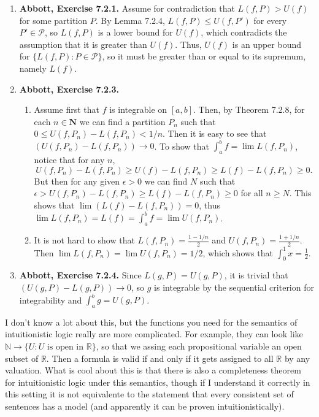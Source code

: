 \documentclass{article}
\newcommand{\N}{\mathbf{N}}
\newcommand{\paren}[1]{\left( #1 \right)}
\newcommand{\set}[1]{\{#1\}}
\newcommand{\exc}[2][Abbott]{\item \textbf{#1, Exercise #2.}}
\begin{document}
\begin{enumerate}
    \exc{7.2.1}
    Assume for contradiction that $L(f, P) > U(f)$ for some partition $P$. By Lemma 7.2.4, $L(f, P) \leq U(f, P')$ for every $P' \in \mathcal{P}$, so $L(f, P)$ is a lower bound for $U(f)$, which contradicts the assumption that it is greater than $U(f)$. Thus, $U(f)$ is an upper bound for $\set{L(f, P): P \in \mathcal{P}}$, so it must be greater than or equal to its supremum, namely $L(f)$.
    
    \exc{7.2.3}
    \begin{enumerate}
        \item Assume first that $f$ is integrable on $[a, b]$. Then, by Theorem 7.2.8, for each $n \in \N$ we can find a partition $P_n$ such that $0 \leq U(f, P_n) - L(f, P_n) < 1/n$. Then it is easy to see that $(U(f, P_n) - L(f, P_n)) \to 0$. To show that $\int_a^b f = \lim L(f, P_n)$, notice that for any $n$,
        \begin{equation*}
            U(f, P_n) - L(f, P_n) \geq U(f) - L(f, P_n) \geq L(f) - L(f, P_n) \geq 0.
        \end{equation*} But then for any given $\epsilon > 0$ we can find $N$ such that $\epsilon > U(f, P_n) - L(f, P_n) \geq L(f) - L(f, P_n) \geq 0$ for all $n \geq N$. This shows that $\lim \paren{L(f) - L(f, P_n)} = 0$, thus $\lim L(f, P_n) = L(f) = \int_a^b f = \lim U(f, P_n)$.
        
        \item It is not hard to show that $L(f, P_n) = \frac{1-1/n}{2}$ and $U(f, P_n) = \frac{1+1/n}{2}$. Then $\lim L(f, P_n) = \lim U(f, P_n) = 1/2$, which shows that $\int_0^1 x = \frac{1}{2}$.
    \end{enumerate}
    
    \exc{7.2.4} Since $L(g, P) = U(g, P)$, it is trivial that $(U(g, P) - L(g, P)) \to 0$, so $g$ is integrable by the sequential criterion for integrability and $\int_a^b g = U(g, P)$.
    
\end{enumerate}

I don't know a lot about this, but the functions you need for the semantics of intuitionistic logic really are more complicated. For example, they can look like
$\mathbb{N} \to \{U : U\text{ is open in } \mathbb{R}\}$, so that we assing each propositional variable an open subset of $\mathbb{R}$. Then a formula is valid if and only if 
it gets assigned to all $\mathbb{R}$ by any valuation. What is cool about this is that there is also a completeness theorem for intuitionistic 
logic under this semantics, though if I understand it correctly in this setting it is not equivalente to the statement that every 
consistent set of sentences has a model (and apparently it can be proven intuitionistically).
\end{document}
